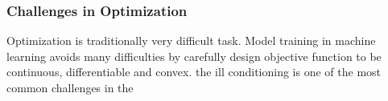 \subsubsection{Challenges in Optimization}

Optimization is traditionally very difficult task. Model training in machine learning avoids many difficulties by carefully design objective function to be continuous, differentiable and convex. 
the ill conditioning is one of the most common challenges in the 